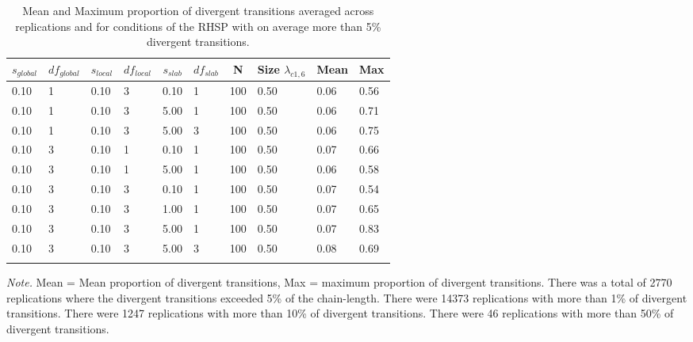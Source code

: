 \documentclass[]{interact}
\theoremstyle{plain}%
\theoremstyle{definition}
\theoremstyle{remark}
\begin{document}
\begin{table}[tbp]

\begin{center}
\begin{threeparttable}

\caption{\label{tab:unnamed-chunk-4}Mean and Maximum proportion of divergent transitions averaged across replications and for conditions of the RHSP with on average more than 5\% divergent transitions.}

\begin{tabular}{llllllllll}
\toprule
$s_{global}$ & \multicolumn{1}{c}{$df_{global}$} & \multicolumn{1}{c}{$s_{local}$} & \multicolumn{1}{c}{$df_{local}$} & \multicolumn{1}{c}{$s_{slab}$} & \multicolumn{1}{c}{$df_{slab}$} & \multicolumn{1}{c}{N} & \multicolumn{1}{c}{Size $\lambda_{c1 , 6}$} & \multicolumn{1}{c}{Mean} & \multicolumn{1}{c}{Max}\\
\midrule
0.10 & 1 & 0.10 & 3 & 0.10 & 1 & 100 & 0.50 & 0.06 & 0.56\\
0.10 & 1 & 0.10 & 3 & 5.00 & 1 & 100 & 0.50 & 0.06 & 0.71\\
0.10 & 1 & 0.10 & 3 & 5.00 & 3 & 100 & 0.50 & 0.06 & 0.75\\
0.10 & 3 & 0.10 & 1 & 0.10 & 1 & 100 & 0.50 & 0.07 & 0.66\\
0.10 & 3 & 0.10 & 1 & 5.00 & 1 & 100 & 0.50 & 0.06 & 0.58\\
0.10 & 3 & 0.10 & 3 & 0.10 & 1 & 100 & 0.50 & 0.07 & 0.54\\
0.10 & 3 & 0.10 & 3 & 1.00 & 1 & 100 & 0.50 & 0.07 & 0.65\\
0.10 & 3 & 0.10 & 3 & 5.00 & 1 & 100 & 0.50 & 0.07 & 0.83\\
0.10 & 3 & 0.10 & 3 & 5.00 & 3 & 100 & 0.50 & 0.08 & 0.69\\
\bottomrule
\addlinespace
\end{tabular}

\begin{tablenotes}[para]
\normalsize{\textit{Note.} Mean = Mean proportion of divergent transitions, Max = maximum proportion of divergent transitions. There was a total of 2770 replications where the divergent transitions exceeded 5\% of the chain-length. There were 14373 replications with more than 1\% of divergent transitions. There were 1247 replications with more than 10\% of divergent transitions. There were 46 replications with more than 50\% of divergent transitions.}
\end{tablenotes}

\end{threeparttable}
\end{center}

\end{table}
\end{document}
